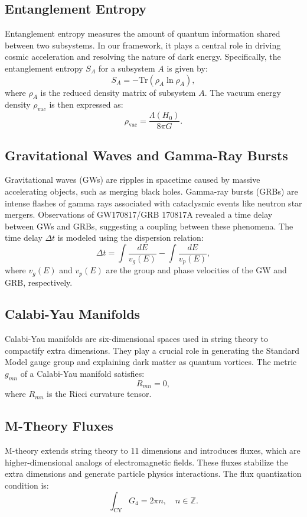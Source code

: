 \documentclass[12pt]{article}
\begin{document}
\subsection{Entanglement Entropy}
Entanglement entropy measures the amount of quantum information shared between two subsystems. In our framework, it plays a central role in driving cosmic acceleration and resolving the nature of dark energy. Specifically, the entanglement entropy $S_A$ for a subsystem $A$ is given by:
\[
S_A = -\text{Tr}(\rho_A \ln \rho_A),
\]
where $\rho_A$ is the reduced density matrix of subsystem $A$. The vacuum energy density $\rho_{\text{vac}}$ is then expressed as:
\[
\rho_{\text{vac}} = \frac{\Lambda(H_0)}{8\pi G}.
\]

\subsection{Gravitational Waves and Gamma-Ray Bursts}
Gravitational waves (GWs) are ripples in spacetime caused by massive accelerating objects, such as merging black holes. Gamma-ray bursts (GRBs) are intense flashes of gamma rays associated with cataclysmic events like neutron star mergers. Observations of GW170817/GRB 170817A revealed a time delay between GWs and GRBs, suggesting a coupling between these phenomena. The time delay $\Delta t$ is modeled using the dispersion relation:
\[
\Delta t = \int \frac{dE}{v_g(E)} - \int \frac{dE}{v_p(E)},
\]
where $v_g(E)$ and $v_p(E)$ are the group and phase velocities of the GW and GRB, respectively.

\subsection{Calabi-Yau Manifolds}
Calabi-Yau manifolds are six-dimensional spaces used in string theory to compactify extra dimensions. They play a crucial role in generating the Standard Model gauge group and explaining dark matter as quantum vortices. The metric $g_{mn}$ of a Calabi-Yau manifold satisfies:
\[
R_{mn} = 0,
\]
where $R_{mn}$ is the Ricci curvature tensor.

\subsection{M-Theory Fluxes}
M-theory extends string theory to 11 dimensions and introduces fluxes, which are higher-dimensional analogs of electromagnetic fields. These fluxes stabilize the extra dimensions and generate particle physics interactions. The flux quantization condition is:
\[
\int_{\text{CY}} G_4 = 2\pi n, \quad n \in \mathbb{Z}.
\]
\end{document}
